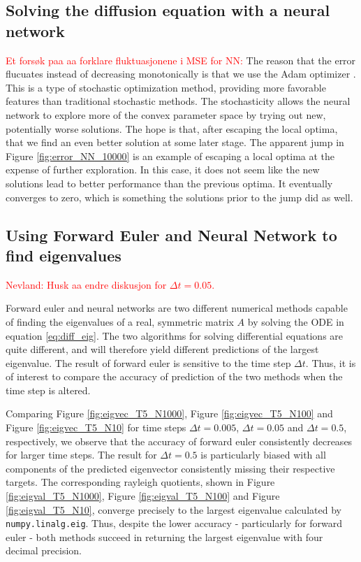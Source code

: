 \documentclass[12pt]{extarticle}
\def\code#1{\texttt{#1}}
\begin{document}
\subsection{Solving the diffusion equation with a neural network}

\par \textcolor{red}{Et forsøk paa aa forklare fluktuasjonene i MSE for NN:} The reason that the error flucuates instead of decreasing monotonically is that we use the Adam optimizer \cite{kingma2017adam}. This is a type of stochastic optimization method, providing more favorable features than traditional stochastic methods. The stochasticity allows the neural network to explore more of the convex parameter space by trying out new, potentially worse solutions. The hope is that, after escaping the local optima, that we find an even better solution at some later stage. The apparent jump in Figure \ref{fig:error_NN_10000} is an example of escaping a local optima at the expense of further exploration. In this case, it does not seem like the new solutions lead to better performance than the previous optima. It eventually converges to zero, which is something the solutions prior to the jump did as well. 

\subsection*{Using Forward Euler and Neural Network to find eigenvalues}

\textcolor{red}{Nevland: Husk aa endre diskusjon for $\Delta t=0.05$.}

Forward euler and neural networks are two different numerical methods capable of finding the eigenvalues of a real, symmetric matrix $A$ by solving the ODE in equation \eqref{eq:diff_eig}. The two algorithms for solving differential equations are quite different, and will therefore yield different predictions of the largest eigenvalue. The result of forward euler is sensitive to the time step $\Delta t$. Thus, it is of interest to compare the accuracy of prediction of the two methods when the time step is altered. 

Comparing Figure \ref{fig:eigvec_T5_N1000}, Figure \ref{fig:eigvec_T5_N100} and Figure \ref{fig:eigvec_T5_N10} for time steps $\Delta t = 0.005$, $\Delta t = 0.05$ and $\Delta t = 0.5$, respectively, we observe that the accuracy of forward euler consistently decreases for larger time steps. The result for $\Delta t=0.5$ is particularly biased with all components of the predicted eigenvector consistently missing their respective targets. The corresponding rayleigh quotients, shown in Figure \ref{fig:eigval_T5_N1000}, Figure \ref{fig:eigval_T5_N100} and Figure \ref{fig:eigval_T5_N10}, converge precisely to the largest eigenvalue calculated by \code{numpy.linalg.eig}. Thus, despite the lower accuracy - particularly for forward euler - both methods succeed in returning the largest eigenvalue with four decimal precision.
\end{document}

